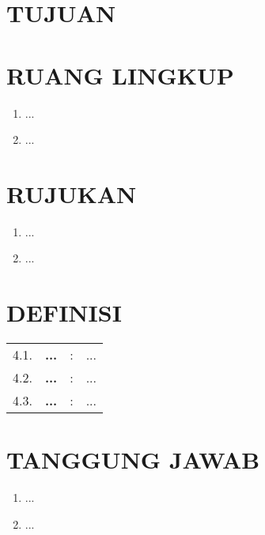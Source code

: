 \documentclass[12pt]{sop}
\begin{document}
\begin{longtable}{|c|c|p{11.7cm}|}
    \end{longtable}

    \newpage

    \section{TUJUAN}

    \section{RUANG LINGKUP}
    \begin{enumerate}
        \item ...
        \item ...
    \end{enumerate}

    \section{RUJUKAN}
    \begin{enumerate}
        \item ...
        \item ...
    \end{enumerate}

    \section{DEFINISI}
    \begin{longtable}{r p{2cm} c p{12.7cm}}
        4.1. & \textbf{...} & : & ...\\
        4.2. & \textbf{...} & : & ...\\
        4.3. & \textbf{...} & : & ...\\
    \end{longtable}

    \section{TANGGUNG JAWAB}
    \begin{enumerate}
        \item ...
        \item ...
    \end{enumerate}
\end{document}
